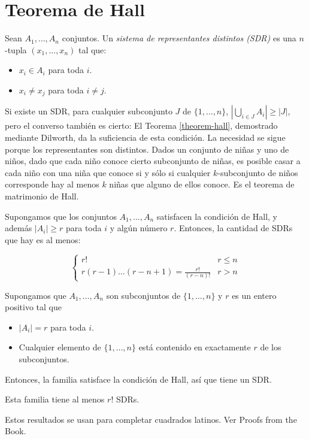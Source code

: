 \section{Teorema de Hall}\label{chap-hall}
\begin{definition}
\label{definition-combi-023}
Sean $A_1, \ldots,A_n$ conjuntos. Un
\emph{sistema de representantes distintos
(SDR)} es una $n$-tupla $(x_1, \ldots,x_n)$
tal que:
\begin{itemize}
\item[(a)] $x_i\in A_i$ para toda $i$.
\item[(b)] $x_i\neq x_j$ para toda $i\neq j$.
\end{itemize}
\end{definition}
Si existe un SDR, para cualquier subconjunto
$J$ de $\{1, \ldots,n\}$, $
\left|\bigcup_{i\in J}A_i \right|\geq|J|$,
pero el converso también es cierto:
El Teorema \ref{theorem-hall}, demostrado
mediante Dilworth, da la suficiencia de esta
condición. La necesidad se sigue porque los
representantes son distintos.
Dados un conjunto de niñas y uno de niños,
dado que cada niño conoce cierto subconjunto
de niñas, es posible casar a cada niño con
una niña que conoce si y sólo si cualquier
$k$-subconjunto de niños corresponde hay al
menos $k$ niñas que alguno de ellos conoce.
Es el teorema de matrimonio de Hall.
\begin{theorem}
\label{theorem-combi-020}
Supongamos que los conjuntos $A_1,
\ldots,A_n$ satisfacen la condición de Hall,
y además $|A_i|\geq r$ para toda $i$ y algún
número $r$. Entonces, la cantidad de SDRs que
hay es al menos:

$$
\begin{cases}
r!\qquad&r\leq n\\
r(r-1)\ldots(r-n+1)=\frac{r!}{(r-n)!}&r>n
\end{cases}
$$

\end{theorem}
\begin{theorem}
\label{theorem-combi-021}
Supongamos que $A_1, \ldots,A_n$ son
subconjuntos de $\{1, \ldots,n\}$ y $r$ es un
entero positivo tal que
\begin{itemize}
\item[(a)] $|A_i|=r$ para toda $i$.
\item[(b)] Cualquier elemento de $\{1,
\ldots,n\}$ está contenido en exactamente $r$
de los subconjuntos.
\end{itemize}
Entonces, la familia satisface la condición
de Hall, así que tiene un SDR.
\end{theorem}
\begin{corollary}
\label{corollary-combi-002}
Esta familia tiene al menos $r!$ SDRs.
\end{corollary}
Estos resultados se usan para completar
cuadrados latinos. Ver Proofs from the Book.
